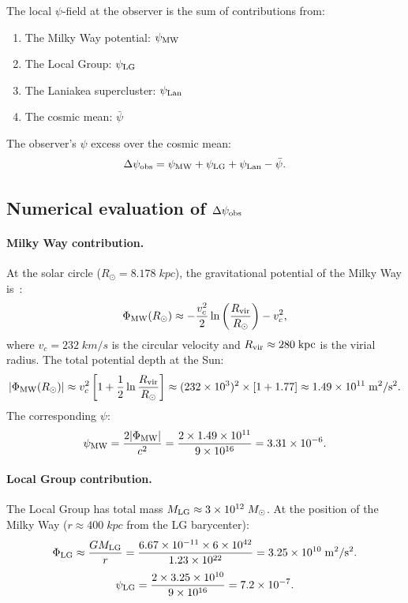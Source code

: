 \documentclass[aps,prd,twocolumn,superscriptaddress,nofootinbib,longbibliography]{revtex4-2}
\begin{document}
The local $\psi$-field at the observer is the sum of contributions from:
\begin{enumerate}
\item The Milky Way potential: $\psi_{\rm MW}$
\item The Local Group: $\psi_{\rm LG}$
\item The Laniakea supercluster: $\psi_{\rm Lan}$
\item The cosmic mean: $\bar{\psi}$
\end{enumerate}

The observer's $\psi$ excess over the cosmic mean:
\begin{equation}\label{eq:psi-excess}
\Delta\psi_{\rm obs} = \psi_{\rm MW} + \psi_{\rm LG} + \psi_{\rm Lan} - \bar{\psi}.
\end{equation}

\subsection{Numerical evaluation of $\Delta\psi_{\rm obs}$}\label{sec:psi-numerical}

\paragraph{Milky Way contribution.}
At the solar circle ($R_\odot = 8.178\;\si{kpc}$), the gravitational
potential of the Milky Way is~\cite{McMillan2017}:
\begin{equation}
\Phi_{\rm MW}(R_\odot) \approx -\frac{v_c^2}{2}\ln\left(\frac{R_{\rm vir}}{R_\odot}\right)
- v_c^2,
\end{equation}
where $v_c = 232\;\si{km/s}$ is the circular velocity and
$R_{\rm vir} \approx 280\;\si{kpc}$ is the virial radius.
The total potential depth at the Sun:
\begin{equation}
|\Phi_{\rm MW}(R_\odot)| \approx v_c^2\left[1 + \frac{1}{2}\ln\frac{R_{\rm vir}}{R_\odot}\right]
\approx (232\times10^3)^2\times[1 + 1.77]
\approx 1.49\times10^{11}\;\si{m^2/s^2}.
\end{equation}
The corresponding $\psi$:
\begin{equation}
\psi_{\rm MW} = \frac{2|\Phi_{\rm MW}|}{c^2} = \frac{2\times1.49\times10^{11}}{9\times10^{16}}
= 3.31\times10^{-6}.
\end{equation}

\paragraph{Local Group contribution.}
The Local Group has total mass $M_{\rm LG} \approx 3\times10^{12}\;M_\odot$.
At the position of the Milky Way ($r \approx 400\;\si{kpc}$ from the
LG barycenter):
\begin{equation}
\Phi_{\rm LG} \approx \frac{GM_{\rm LG}}{r}
= \frac{6.67\times10^{-11}\times 6\times10^{42}}{1.23\times10^{22}}
= 3.25\times10^{10}\;\si{m^2/s^2}.
\end{equation}
\begin{equation}
\psi_{\rm LG} = \frac{2\times3.25\times10^{10}}{9\times10^{16}} = 7.2\times10^{-7}.
\end{equation}
\end{document}
